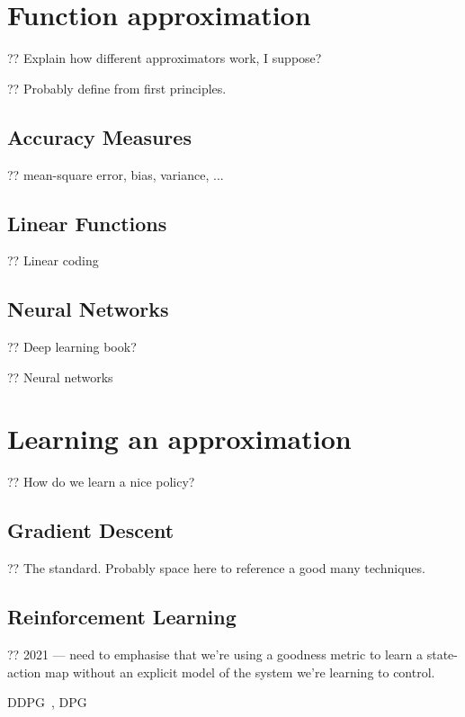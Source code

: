 \section{Function approximation}\label{sec:function-approximation}

?? Explain how different approximators work, I suppose?

?? Probably  define from first principles.

\subsection{Accuracy Measures}

?? mean-square error, bias, variance, ...

\subsection{Linear Functions}

?? Linear coding

\subsection{Neural Networks}

?? Deep learning book?~\cite{DBLP:books/daglib/0040158}

?? Neural networks

\section{Learning an approximation}\label{sec:learning-an-approximation}

?? How do we learn a nice policy?

\subsection{Gradient Descent}

?? The standard. Probably space here to reference a good many techniques.

\subsection{Reinforcement Learning}

?? 2021 --- need to emphasise that we're using a goodness metric to learn a state-action map without an explicit model of the system we're learning to control.

DDPG~\parencite{DBLP:journals/corr/LillicrapHPHETS15}, DPG~\parencite{DBLP:conf/icml/SilverLHDWR14}

